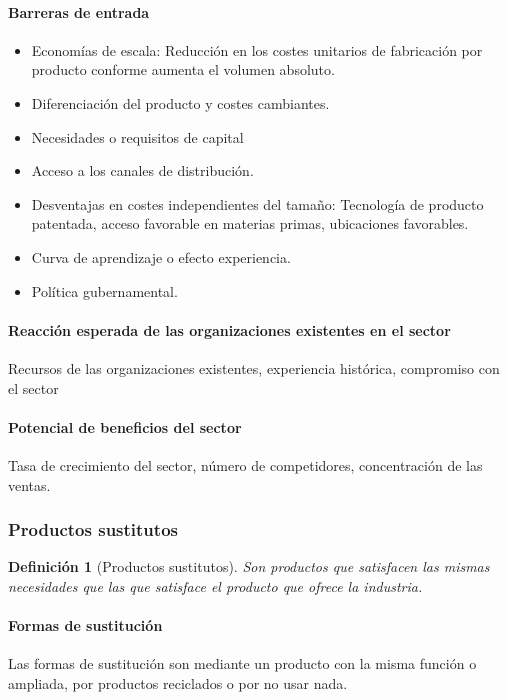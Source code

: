 \documentclass[12pt]{article}
\theoremstyle{definition_wo_parentheses}
\newtheorem{definicion}{Definición}[section]
\begin{document}
\paragraph{Barreras de entrada}
\begin{itemize}
\item Economías de escala: Reducción en los costes unitarios de fabricación por producto conforme aumenta el volumen absoluto.
\item Diferenciación del producto y costes cambiantes.
\item Necesidades o requisitos de capital
\item Acceso a los canales de distribución.
\item Desventajas en costes independientes del tamaño: Tecnología de producto patentada, acceso favorable en materias primas, ubicaciones favorables.
\item Curva de aprendizaje o efecto experiencia.
\item Política gubernamental.
\end{itemize}

\paragraph{Reacción esperada de las organizaciones existentes en el sector} Recursos de las organizaciones existentes, experiencia histórica, compromiso con el sector

\paragraph{Potencial de beneficios del sector} Tasa de crecimiento del sector, número de competidores, concentración de las ventas.

\subsubsection{Productos sustitutos}

\begin{definicion}[Productos sustitutos]
Son productos que satisfacen las mismas necesidades que las que satisface el producto que ofrece la industria.
\end{definicion}

\paragraph{Formas de sustitución} Las formas de sustitución son mediante un producto con la misma función o ampliada, por productos reciclados o por no usar nada.
\end{document}
